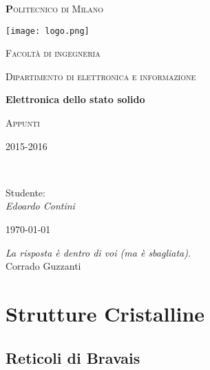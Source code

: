 \documentclass[10pt,a4paper]{report}
\begin{document}
\begin{titlepage}

	\centering
	{\scshape\huge\textbf Politecnico di Milano \par}
	\vspace{0.5cm}

	\texttt{[image: logo.png]}\par\vspace{0.2cm}
	
	{\scshape\small Facoltà di ingegneria\par}
	{\scshape\small Dipartimento di elettronica e informazione\par}
	\vspace{1.5cm}
	{\huge\bfseries Elettronica dello stato solido\par}
	\vspace{1.5cm}
	{\scshape Appunti\par}
	{\scshape\small 2015-2016 \par}
	\vspace{2cm}
	\vfill
    \\[1cm]
	
	\raggedright
    {Studente:\\ \textit{Edoardo Contini}
	
	}\vfill
	\raggedleft
	{\large \today\par}
	
	\raggedright
	\textit{La risposta è dentro di voi (ma è sbagliata)}.
	{\\Corrado Guzzanti}
	\end{titlepage}



\tableofcontents



\chapter{Strutture Cristalline}

	\section{Reticoli di Bravais}
	
\end{document}
